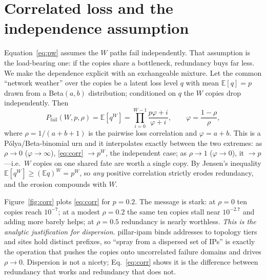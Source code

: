 \documentclass[10pt,twocolumn]{article}
\begin{document}
\section{Correlated loss and the independence assumption}\label{sec:corr}
Equation~\eqref{eq:pw} assumes the $W$ paths fail independently. That assumption
is the load-bearing one: if the copies share a bottleneck, redundancy buys far
less. We make the dependence explicit with an exchangeable mixture. Let the
common ``network weather'' over the copies be a latent loss level $q$ with mean
$\mathbb{E}[q]=p$ drawn from a Beta$(a,b)$ distribution; conditioned on $q$ the
$W$ copies drop independently. Then
\begin{equation}
  P_{\text{fail}}(W,p,\rho)=\mathbb{E}[q^{W}]
   =\prod_{i=0}^{W-1}\frac{p\varphi+i}{\varphi+i},\qquad
   \varphi=\frac{1-\rho}{\rho}, \label{eq:corr}
\end{equation}
where $\rho=1/(a{+}b{+}1)$ is the pairwise loss correlation and $\varphi=a{+}b$.
This is a P\'olya/Beta-binomial urn and it interpolates exactly between the two
extremes: as $\rho\to0$ ($\varphi\to\infty$), \eqref{eq:corr} $\to p^{W}$, the
independent case; as $\rho\to1$ ($\varphi\to0$), it $\to p$---i.e.\ $W$ copies on
one shared fate are worth a single copy. By Jensen's inequality
$\mathbb{E}[q^{W}]\ge(\mathbb{E}q)^{W}=p^{W}$, so \emph{any} positive correlation
strictly erodes redundancy, and the erosion compounds with $W$.

Figure~\ref{fig:corr} plots \eqref{eq:corr} for $p{=}0.2$. The message is stark:
at $\rho{=}0$ ten copies reach $10^{-7}$; at a modest $\rho{=}0.2$ the same ten
copies stall near $10^{-2.7}$ and adding more barely helps; at $\rho{=}0.5$
redundancy is nearly worthless. \emph{This is the analytic justification for
dispersion.} pillar-ipam binds addresses to topology tiers and sites hold
distinct prefixes, so ``spray from a dispersed set of IPs'' is exactly the
operation that pushes the copies onto uncorrelated failure domains and drives
$\rho\to0$. Dispersion is not a nicety; Eq.~\eqref{eq:corr} shows it is the
difference between redundancy that works and redundancy that does not.
\end{document}
